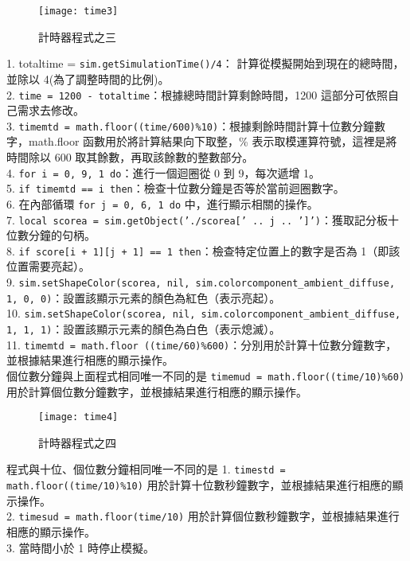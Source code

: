 \begin{figure}[hbt!]
\begin{center}
\texttt{[image: time3]}
\caption{\Large 計時器程式之三}\label{計時器程式之三}
\end{center}
\end{figure} 
1. totaltime = \texttt{sim.getSimulationTime()/4}： 計算從模擬開始到現在的總時間，並除以 4(為了調整時間的比例)。\\
2. \texttt{time = 1200 - totaltime}：根據總時間計算剩餘時間，1200 這部分可依照自己需求去修改。\\
3. \texttt{timemtd = math.floor((time/600)\%10)}：根據剩餘時間計算十位數分鐘數字，math.floor 函數用於將計算結果向下取整，\% 表示取模運算符號，這裡是將時間除以 600 取其餘數，再取該餘數的整數部分。\\
4. \texttt{for i = 0, 9, 1 do}：進行一個迴圈從 0 到 9，每次遞增 1。\\
5. \texttt{if timemtd == i then}：檢查十位數分鐘是否等於當前迴圈數字。\\
6. 在內部循環 \texttt{for j = 0, 6, 1 do} 中，進行顯示相關的操作。\\
7. \texttt{local scorea = sim.getObject('./scorea[' .. j .. ']')}：獲取記分板十位數分鐘的句柄。\\
8. \texttt{if score[i + 1][j + 1] == 1 then}：檢查特定位置上的數字是否為 1（即該位置需要亮起）。\\
9. \texttt{sim.setShapeColor(scorea, nil, sim.colorcomponent_ambient_diffuse, {1, 0, 0})}：設置該顯示元素的顏色為紅色（表示亮起）。\\
10. \texttt{sim.setShapeColor(scorea, nil, sim.colorcomponent_ambient_diffuse, {1, 1, 1})}：設置該顯示元素的顏色為白色（表示熄滅）。\\
11. \texttt{timemtd = math.floor ((time/60)\%600)}：分別用於計算十位數分鐘數字，並根據結果進行相應的顯示操作。\\
個位數分鐘與上面程式相同唯一不同的是 \texttt{timemud = math.floor((time/10)\%60)}用於計算個位數分鐘數字，並根據結果進行相應的顯示操作。\\
\newpage

\begin{figure}[hbt!]
\begin{center}
\texttt{[image: time4]}
\caption{\Large 計時器程式之四}\label{計時器程式之四}
\end{center}
\end{figure} 
程式與十位、個位數分鐘相同唯一不同的是 
1. \texttt{timestd = math.floor((time/10)\%10)} 用於計算十位數秒鐘數字，並根據結果進行相應的顯示操作。\\
2. \texttt{timesud = math.floor(time/10)} 用於計算個位數秒鐘數字，並根據結果進行相應的顯示操作。\\
3. 當時間小於 1 時停止模擬。\\
\newpage
\renewcommand{\baselinestretch}{1.0} %